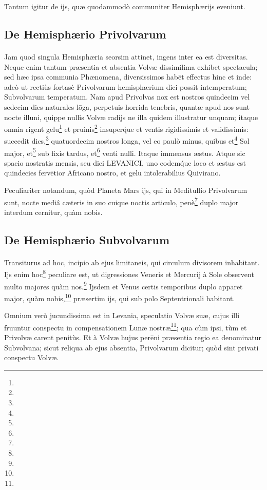 \documentclass[a4paper, 11pt, oneside, polutonikogreek, german]{article}
\begin{document}
Tantum igitur de ijs, quæ quodammodò communiter Hemisphærijs eveniunt.

\subsection{De Hemisphærio Privolvarum}
\paragraph{}
Jam quod singula Hemisphæria seorsim attinet, ingens inter ea est diversitas. Neque enim tantum præsentia et absentia Volvæ dissimilima exhibet spectacula; sed hæc ipsa communia Phænomena, diversissimos habēt effectus hinc et inde: adeò ut rectiùs fortasè Privolvarum hemisphærium dici possit intemperatum; Subvolvarum temperatum. Nam apud Privolvas nox est nostros quindecim vel sedecim dies naturales lōga, perpetuis horrida tenebris, quantæ apud nos sunt nocte illuni, quippe nullis Volvæ radijs ne illa quidem illustratur unquam; itaque omnia rigent gelu\footnote{} et pruinis\footnote{} insuper\'que et ventis rigidissimis et validissimis: succedit dies,\footnote{} quatuordecim nostros longa, vel eo paulò minus, quibus et\footnote{} Sol major, et\footnote{} sub fixis tardus, et\footnote{} venti nulli. Itaque immensus æstus. Atque sic spacio nostratis mensis, seu diei LEVANICI, uno eodem\'que loco et æstus est quindecies fervētior Africano nostro, et gelu intolerabilius Quivirano.

Peculiariter notandum, quòd Planeta Mars ijs, qui in Meditullio Privolvarum sunt, nocte mediâ cæteris in suo cuique noctis articulo, penè\footnote{} duplo major interdum cernitur, quàm nobis.

\subsection{De Hemisphærio Subvolvarum}
\paragraph{}
Transiturus ad hoc, incipio ab ejus limitaneis, qui circulum divisorem inhabitant. Ijs enim hoc\footnote{} peculiare est, ut digressiones Veneris et Mercurij à Sole observent multo majores quàm nos.\footnote{} Ijsdem et Venus certis temporibus duplo apparet major, quàm nobis,\footnote{} præsertim ijs, qui sub polo Septentrionali habitant.

Omnium verò jucundissima est in Levania, speculatio Volvæ suæ, cujus illi fruuntur conspectu in compensationem Lunæ nostræ\footnote{}; qua cùm ipsi, tùm et Privolvæ carent penitùs. Et à Volvæ hujus perēni præsentia regio ea denominatur Subvolvana; sicut reliqua ab ejus absentia, Privolvarum dicitur; quòd sint privati conspectu Volvæ.
\end{document}
